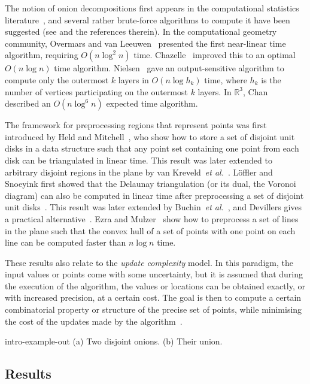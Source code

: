 \documentclass{paper}
\newcommand {\R} {\mathbb {R}}
\newcommand {\etal} {\textit {et al.}}
\begin{document}
The notion of onion decompositions first appears in the 
computational statistics literature~\cite{h-rsar-72}, and several rather 
brute-force algorithms to compute it have been suggested 
(see \cite{e-chp-82} and the references therein).
In the computational geometry community, Overmars and van 
Leeuwen~\cite{ol-mcp-81} presented the first near-linear time algorithm,  
requiring $O(n \log^2 n)$ time.
Chazelle~\cite{c-clps-85} improved this to an optimal $O(n \log n)$ time 
algorithm.
Nielsen~\cite{n-ospcml-96} gave an output-sensitive algorithm to compute 
only the outermost $k$ layers in $O(n \log h_k)$ time, where $h_k$ is the 
number of vertices participating on the outermost $k$ layers.
In $\R^3$, Chan~\cite{c-addsf3cha2nnq-10} described an $O (n \log^{6} n)$ 
expected time algorithm.

The framework for preprocessing regions that represent points was first 
introduced by Held and Mitchell~\cite {hm-tipps-08}, who show how to store 
a set of disjoint unit disks in a data structure such that any point set 
containing one point from each disk can be triangulated in linear time.
This result was later extended to arbitrary disjoint regions in the plane 
by van Kreveld~\etal~\cite{klm-pipast-10}.
L\"offler and Snoeyink first showed that the Delaunay triangulation (or its 
dual, the Voronoi diagram) can also be computed in linear time after 
preprocessing a set of disjoint unit disks~\cite{ls-dtoipiltap-10}.
This result was later extended by Buchin~\etal~\cite{blmm-pipfdtsae-11},
and Devillers gives a practical alternative~\cite{d-dtoippaagafqt-11}.
Ezra and Mulzer~\cite{em-choipitap-13} show how to preprocess a set of 
lines in the plane such that the convex hull of a set of points with 
one point on each line can be computed faster than $n \log n$ time.

These results also relate to the \emph{update complexity} model. 
In this paradigm, the input values or points come with some uncertainty,
but it is assumed that during the execution of the algorithm, the values or 
locations can be obtained exactly, or with increased precision, at a 
certain cost. 
The goal is then to compute a certain combinatorial property or structure 
of the precise set of points, while minimising the cost of the updates 
made by the 
algorithm~\cite{bhkr-eusgcu-05,fggt-chapa-94,hekmr-cmstu-08,tk-itet-11}.

 {intro-example-out} 
{ (a) Two disjoint onions. (b) Their union.}

\subsection{Results}
\end{document}
